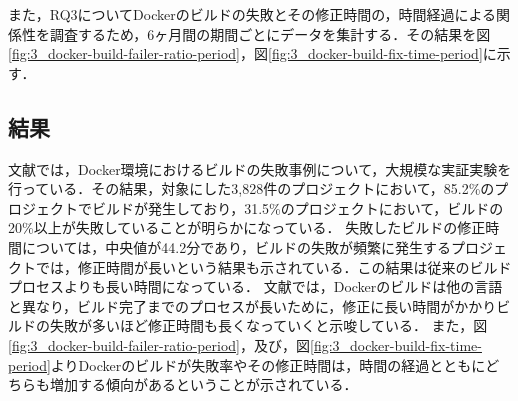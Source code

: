 
また，RQ3についてDockerのビルドの失敗とその修正時間の，時間経過による関係性を調査するため，6ヶ月間の期間ごとにデータを集計する．その結果を図\ref{fig:3_docker-build-failer-ratio-period}，図\ref{fig:3_docker-build-fix-time-period}に示す．





\subsection{結果}
文献\cite{docker-failures}では，Docker環境におけるビルドの失敗事例について，大規模な実証実験を行っている．その結果，対象にした3,828件のプロジェクトにおいて，85.2\%のプロジェクトでビルドが発生しており，31.5\%のプロジェクトにおいて，ビルドの20\%以上が失敗していることが明らかになっている．
失敗したビルドの修正時間については，中央値が44.2分であり，ビルドの失敗が頻繁に発生するプロジェクトでは，修正時間が長いという結果も示されている．この結果は従来のビルドプロセスよりも長い時間になっている．
文献\cite{docker-failures}では，Dockerのビルドは他の言語と異なり，ビルド完了までのプロセスが長いために，修正に長い時間がかかりビルドの失敗が多いほど修正時間も長くなっていくと示唆している．
また，図\ref{fig:3_docker-build-failer-ratio-period}，及び，図\ref{fig:3_docker-build-fix-time-period}よりDockerのビルドが失敗率やその修正時間は，時間の経過とともにどちらも増加する傾向があるということが示されている．

